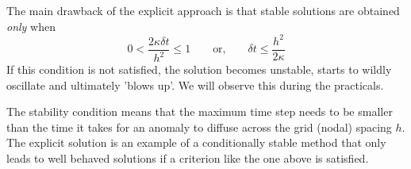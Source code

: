 \noindent The main drawback of the explicit approach is that stable solutions are
obtained {\it only} when
\begin{equation}
0 < \frac{2\kappa \delta t}{h^2} \leq1
\qquad
\text{or,}
\qquad
\delta t \leq \frac{h^2}{2 \kappa}
\end{equation}
If this condition is not satisfied, the solution becomes {\color{olive} unstable}, starts to
wildly oscillate and ultimately 'blows up'. We will observe this during the practicals. 

The stability condition means that the maximum time step needs to be smaller than the time it
takes for an anomaly to diffuse across the grid (nodal) spacing $h$.
The explicit solution is an example of a {\color{olive} conditionally stable method}
that only leads to well behaved solutions if a criterion like the one above is satisfied.

